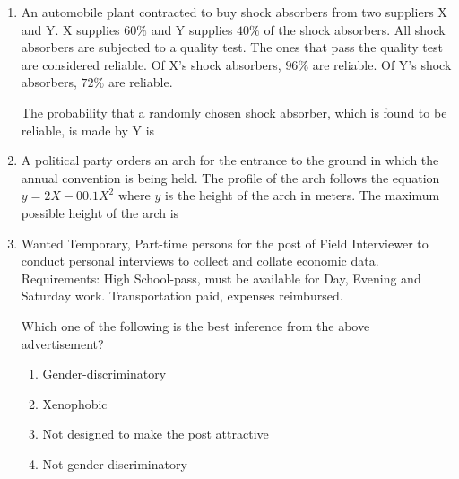 \documentclass[journal,12pt,onecolumn]{IEEEtran}
\theoremstyle{remark}
\begin{document}
\begin{enumerate}
\item An automobile plant contracted to buy shock absorbers from two suppliers X and Y. X supplies $60\%$ and Y supplies $40\%$ of the shock absorbers. All shock absorbers are subjected to a quality test. The ones that pass the quality test are considered reliable. Of X's shock absorbers, $96\%$ are reliable. Of Y's shock absorbers, $72\%$ are reliable.
    
    The probability that a randomly chosen shock absorber, which is found to be reliable, is made by Y is
    \hfill{}
    \begin{enumerate}
    \end{enumerate}

\item A political party orders an arch for the entrance to the ground in which the annual convention is being held. The profile of the arch follows the equation $y = 2X - 00.1X^2$ where $y$ is the height of the arch in meters. The maximum possible height of the arch is
\hfill{}
    \begin{enumerate}
\end{enumerate}

\item Wanted Temporary, Part-time persons for the post of Field Interviewer to conduct personal interviews to collect and collate economic data. Requirements: High School-pass, must be available for Day, Evening and Saturday work. Transportation paid, expenses reimbursed.
    
    Which one of the following is the best inference from the above advertisement?
    \hfill{}
    \begin{enumerate}
        \item Gender-discriminatory
        \item Xenophobic
        \item Not designed to make the post attractive
        \item Not gender-discriminatory
    \end{enumerate}


\end{enumerate}
\end{document}
